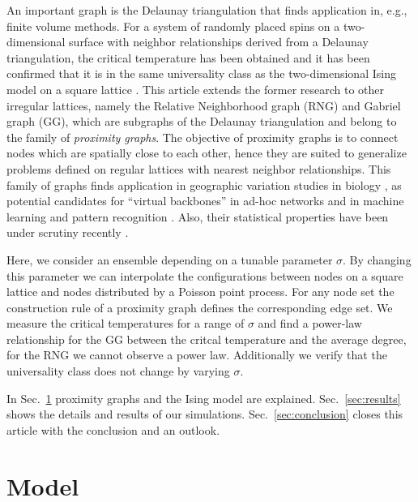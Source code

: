 \documentclass[pre,twocolumn,groupedaddress,showpacs,showkeys,amsmath,amssymb,floatfix]{revtex4-1}
\begin{document}
        An important graph is the Delaunay triangulation that finds application
        in, e.g., finite volume methods.
        For a system of randomly placed spins on a two-dimensional surface
        with neighbor relationships derived from a Delaunay triangulation,
        the critical temperature has been obtained
        and it has been confirmed that it is in the same universality class as the
        two-dimensional Ising model on a square lattice \cite{Janke1994,Lima2000,Lima2008}.
        This article extends the former research to other
        irregular lattices, namely the Relative Neighborhood graph (RNG) and
        Gabriel graph (GG), which are subgraphs of the Delaunay triangulation
        and belong to the family of \emph{proximity graphs}.
        The objective of proximity graphs is to connect nodes which are
        spatially close to each other, hence they are suited
        to generalize problems defined on regular lattices with nearest neighbor
        relationships.
        This family of graphs finds application in geographic variation studies in
        biology \cite{Sokal1978,Sokal1980,Selander1975}, as potential candidates for ``virtual backbones'' in ad-hoc
        networks \cite{Kuhn2003,Bose2001,Santi2005,Karp2000,jennings2002topology}
        and in machine learning and pattern recognition \cite{bhattacharya1981application}.
        Also, their statistical properties have been under scrutiny recently \cite{RNGCell,norrenbrock2014percolation}.

        Here, we consider an ensemble depending on a tunable parameter $\sigma$.
        By changing this parameter we can interpolate the configurations
        between nodes on a square lattice and nodes distributed by a Poisson point process.
        For any node set the construction rule of a proximity
        graph defines the corresponding edge set.
        We measure the critical temperatures for a range of $\sigma$ and find
        a power-law relationship for the GG between the critcal temperature and
        the average degree, for the RNG we cannot observe a power law.
        Additionally we verify that the universality class does not change by
        varying $\sigma$.

        In Sec.~\ref{sec:model} proximity graphs and the Ising model
        are explained. Sec.~\ref{sec:results} shows the
        details and results of our simulations. Sec.~\ref{sec:conclusion}
        closes this article with the conclusion and an outlook.


    \section{Model}
        \label{sec:model}
\end{document}
